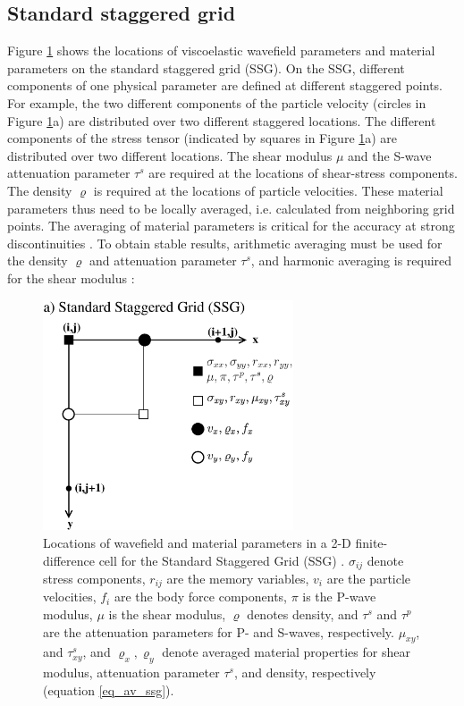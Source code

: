 \documentclass[11pt,onecolumn,oneside]{article}
\begin{document}
 \subsection{Standard staggered grid}
 \label{ssg}
Figure \ref{fig_cell} shows the locations of viscoelastic wavefield parameters and material parameters on the standard staggered grid (SSG). 
On the SSG, different components of one physical parameter are defined at different staggered points. For example, the two different components of the particle velocity (circles in Figure \ref{fig_cell}a) are distributed over two different staggered locations. The different components of the stress tensor (indicated by squares in Figure \ref{fig_cell}a) are distributed over two different locations. The shear modulus $\mu$ and the S-wave attenuation parameter $\tau^s$ \cite{blanch:95,bohlen:02} are required at the locations of shear-stress components. The density $\varrho$ is required
at the locations of particle velocities. These material parameters thus need to be locally averaged, i.e. calculated from neighboring grid points. The averaging of material parameters is critical
for the accuracy at strong discontinuities \cite{zahradnik:93,falk:98,moczo:02}. To obtain stable results, arithmetic averaging  must be used for the density $\varrho$ and attenuation parameter $\tau^s$, and harmonic averaging is required for the shear modulus \cite{fellinger:95,graves:96,falk:98,vossen:02,moczo:02}:

\begin{figure}[tb]
\begin{center}
\includegraphics[width=7.4cm,angle=0]{eps/cells_2D_ssg.eps}
\end{center}
\caption{Locations of wavefield and material parameters in a 2-D finite-difference cell for the Standard Staggered Grid (SSG) \protect\cite{virieux:86,levander:88,robertsson:94}. $\sigma_{ij}$ denote stress components, $r_{ij}$ are the memory variables, $v_i$ are the particle velocities, $f_i$ are the body force components, $\pi$ is the P-wave modulus, $\mu$ is the shear modulus, $\varrho$ denotes density, and $\tau^s$ and $\tau^p$ are the attenuation parameters for P- and S-waves, respectively. $\mu_{xy}$, and $\tau^s_{xy}$,
and $\varrho_x, \varrho_y$ denote averaged material properties for shear modulus, attenuation parameter $\tau^s$, and density, respectively (equation \protect\ref{eq_av_ssg}).}
\label{fig_cell}
\end{figure}
\end{document}
